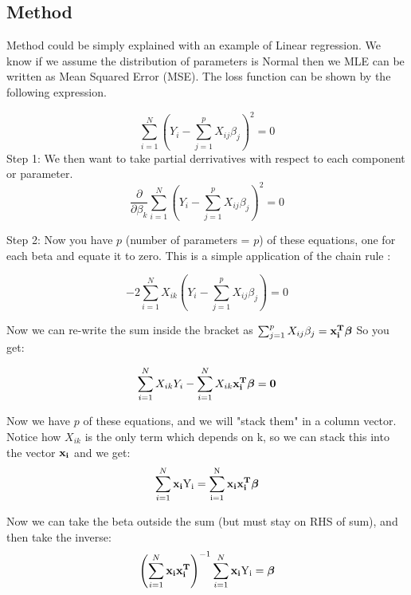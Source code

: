 \subsection{Method}
Method could be simply explained with an example of Linear regression. 
We know if we assume the distribution of parameters is Normal then we MLE can be written as Mean Squared Error (MSE). The loss function can be shown by the following expression. 

\begin{equation}
    \sum_{i=1}^{N}\left(Y_{i}-\sum_{j=1}^{p}X_{ij}\beta_{j}\right)^{2}=0
\end{equation}
\noindent Step 1: We then want to take partial derrivatives with respect to each component or parameter. 
\begin{equation}
    \frac{\partial}{\partial \beta_{k}}\sum_{i=1}^{N}\left(Y_{i}-\sum_{j=1}^{p}X_{ij}\beta_{j}\right)^{2}=0
\end{equation}

\noindent Step 2: Now you have $p$ (number of parameters = $p$) of these equations, one for each beta and equate it to zero. This is a simple application of the chain rule \cite{mse-eq}:

\begin{equation}
    -2\sum_{i=1}^{N}X_{ik}\left(Y_{i}-\sum_{j=1}^{p}X_{ij}\beta_{j}\right)=0
\end{equation}

\noindent Now we can re-write the sum inside the bracket as $\sum_{j=1}^{p}X_{ij}\beta_{j}=\bf{x}_{i}^{T}\boldsymbol{\beta}$ So you get:

\begin{equation}
\sum_{i=1}^{N}X_{ik}Y_{i}-\sum_{i=1}^{N}X_{ik}\bf{x}_{i}^{T}\boldsymbol{\beta}=0    
\end{equation}

\noindent Now we have $p$ of these equations, and we will "stack them" in a column vector. Notice how $X_{ik}$ is the only term which depends on k, so we can stack this into the vector $\bf{x}_{i}$ and we get:
\begin{equation}
\sum_{i=1}^{N}\bf{x}_{i}\rm{Y}_{i}=\sum_{i=1}^{N}\bf{x}_{i}\bf{x}_{i}^{T}\boldsymbol{\beta}    
\end{equation}

\noindent Now we can take the beta outside the sum (but must stay on RHS of sum), and then take the inverse:
\begin{equation}
\left(\sum_{i=1}^{N}\bf{x}_{i}\bf{x}_{i}^{T}\right)^{-1}\sum_{i=1}^{N}\bf{x}_{i}\rm{Y}_{i}=\boldsymbol{\beta}
\end{equation}

